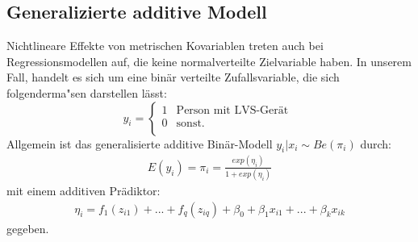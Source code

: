 \documentclass[12pt]{scrreprt}
\begin{document}
	\subsection{Generalizierte additive Modell}
	Nichtlineare Effekte von metrischen Kovariablen treten auch bei Regressionsmodellen auf, die keine normalverteilte Zielvariable haben. In unserem Fall, handelt es sich um eine binär verteilte Zufallsvariable, die sich folgenderma"sen darstellen lässt:\\
	\[y_{i}=\begin{cases}
	1 & \text{Person mit LVS-Gerät } \\
	0 & \text{sonst.} \\
	\end{cases}\]
	Allgemein ist das generalisierte additive Binär-Modell $y_{i}|x_{i}\sim Be(\pi_{i})$ durch:
	\begin{align}
	E(y_{i})=\pi_{i}=\frac{exp(\eta_{i})}{1+exp(\eta_{i})}
	\end{align}
	mit einem additiven Prädiktor:
	\begin{align}
	\eta_{i}=	f_{1}(z_{i1})+...+f_{q}(z_{iq})+\beta_{0}+\beta_{1}x_{i1}+...+\beta_{k}x_{ik}
	\end{align}
	gegeben.


		
\end{document}
